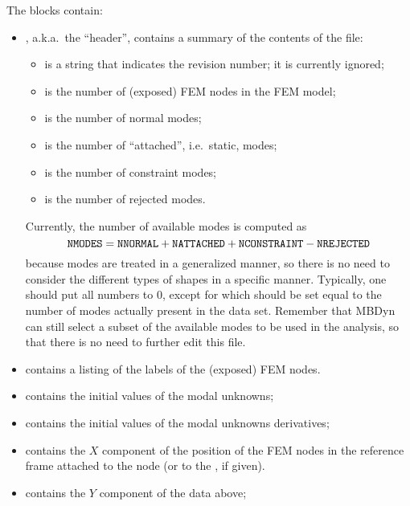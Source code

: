 The blocks contain:
\begin{itemize}
\item {}, a.k.a.\ the ``header'', contains a summary
of the contents of the file:
	\begin{itemize}
	\item {} is a string that indicates the revision number;
	it is currently ignored;
	\item {} is the number of (exposed) FEM nodes 
	in the FEM model;
	\item {} is the number of normal modes;
	\item {} is the number of ``attached'',
	i.e.\ static, modes;
	\item {} is the number of constraint modes;
	\item {} is the number of rejected modes.
	\end{itemize}
Currently, the number of available modes is computed as
\begin{displaymath}
	\texttt{NMODES} = \texttt{NNORMAL} + \texttt{NATTACHED}
		+ \texttt{NCONSTRAINT} - \texttt{NREJECTED}
\end{displaymath}
because modes are treated in a generalized manner,
so there is no need to consider the different types of shapes
in a specific manner.
Typically, one should put all numbers to 0, except for
 which should be set equal to the number of modes
actually present in the data set.
Remember that MBDyn can still select a subset of the available 
modes to be used in the analysis, so that there is no need 
to further edit this file.

\item {} contains a listing of the  labels
of the (exposed) FEM nodes.

\item {} contains the initial values of the 
modal unknowns;

\item {} contains the initial values of the 
modal unknowns derivatives;

\item {} contains the $X$ component of the position
of the  FEM nodes in the reference frame attached 
to the  node (or to the , if given).

\item {} contains the $Y$ component of the data above;


\end{itemize}
